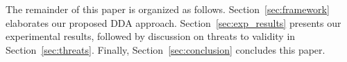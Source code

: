 


The remainder of this paper is organized as follows. Section~\ref{sec:framework} elaborates our proposed DDA approach. Section~\ref{sec:exp_results} presents our experimental results, followed by discussion on threats to validity in Section~\ref{sec:threats}. 
Finally, Section~\ref{sec:conclusion} concludes this paper.


